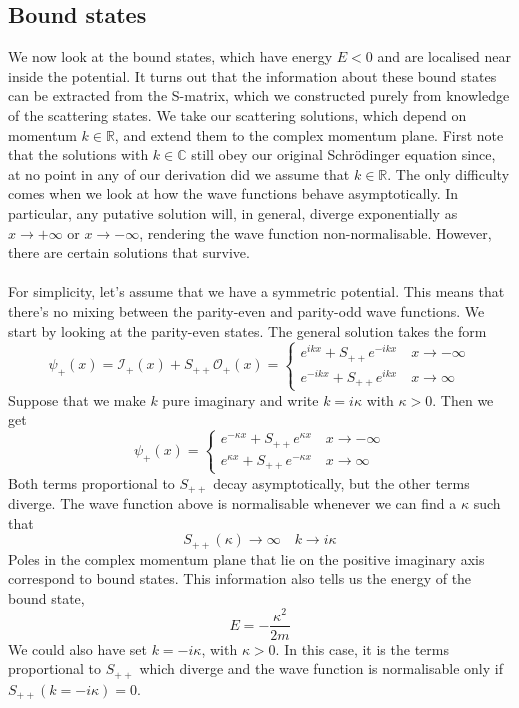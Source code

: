 \subsection{Bound states}
We now look at the bound states, which have energy $E < 0$ and are localised near inside the potential.
It turns out that the information about these bound states can be extracted from the S-matrix, which we constructed purely from knowledge of the scattering states. 
We take our scattering solutions, which depend on momentum $k \in  \mathbb{R}$, and extend them to the complex momentum plane. 
First note that the solutions with $k \in  \mathbb{C}$ still obey our original Schr\"{o}dinger equation since, at no point in any of our derivation did we assume that $k \in  \mathbb{R}$. 
The only difficulty comes when we look at how the wave functions behave asymptotically.
In particular, any putative solution will, in general, diverge exponentially as $x \to +\infty$ or $x \to -\infty$, rendering the wave function non-normalisable. However, there are certain solutions that survive.
\\ \\
For simplicity, let's assume that we have a symmetric potential. This means that there's no mixing between the parity-even and parity-odd wave functions. We start by looking at the parity-even states. The general solution takes the form
\[\psi_+(x) = \mathcal{I}_+(x) + S_{++}\mathcal{O}_+(x)  = \begin{cases} e^{ikx} + S_{++}e^{-ikx} \quad x\to -\infty \\  e^{-ikx} + S_{++}e^{ikx} \quad x\to \infty \end{cases} \]
Suppose that we make $k$ pure imaginary and write $k = i\kappa$ with $\kappa > 0$. Then we get
\[\psi_+(x) = \begin{cases} e^{-\kappa x} + S_{++}e^{\kappa x} \quad x\to -\infty \\  e^{\kappa x} + S_{++}e^{-\kappa x} \quad x\to \infty \end{cases}\]
Both terms proportional to $S_{++}$ decay asymptotically, but the other terms diverge.
The wave function above is normalisable whenever we can find a $\kappa$ such that
\[S_{++}(\kappa) \to \infty \quad k \to i\kappa\]
Poles in the complex momentum plane that lie on the positive imaginary axis correspond to bound states.
This information also tells us the energy of the bound state,
\[E = -\frac{\kappa^2}{2m}\]
We could also have set $k = -i\kappa$, with $\kappa > 0$. In this case, it is the terms proportional to $S_{++}$ which diverge and the wave function is normalisable only if $S_{++}(k = -i\kappa) = 0$. 
